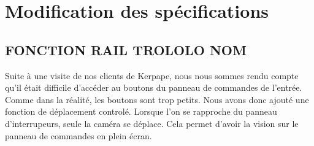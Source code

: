 \section{Modification des spécifications}
\subsection{FONCTION RAIL TROLOLO NOM}
Suite à une visite de nos clients de Kerpape, nous nous sommes rendu compte qu'il était difficile d'accéder au boutons du panneau de commandes de l'entrée. 
Comme dans la réalité, les boutons sont trop petits. Nous avons donc ajouté une fonction de déplacement controlé. Lorsque l'on se rapproche du panneau d'interrupeurs, seule la caméra se déplace.
Cela permet d'avoir la vision sur le panneau de commandes en plein écran.
